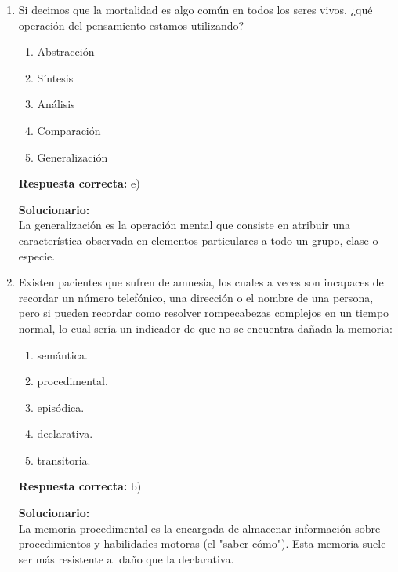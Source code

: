 \begin{enumerate}
	\item Si decimos que la mortalidad es algo común en todos los seres vivos, ¿qué operación del pensamiento estamos utilizando?
	\begin{enumerate}[label=\alph*)]
		\item Abstracción
		\item Síntesis
		\item Análisis
		\item Comparación
		\item Generalización
	\end{enumerate}
	\textbf{Respuesta correcta:} e)
	
	\vspace{2mm}
	\textbf{Solucionario:}\\
	La generalización es la operación mental que consiste en atribuir una característica observada en elementos particulares a todo un grupo, clase o especie.
	
	\vspace{6mm}
	
	\item Existen pacientes que sufren de amnesia, los cuales a veces son incapaces de recordar un número telefónico, una dirección o el nombre de una persona, pero si pueden recordar como resolver rompecabezas complejos en un tiempo normal, lo cual sería un indicador de que no se encuentra dañada la memoria:
	\begin{enumerate}[label=\alph*)]
		\item semántica.
		\item procedimental.
		\item episódica.
		\item declarativa.
		\item transitoria.
	\end{enumerate}
	\textbf{Respuesta correcta:} b)
	
	\vspace{2mm}
	\textbf{Solucionario:}\\
	La memoria procedimental es la encargada de almacenar información sobre procedimientos y habilidades motoras (el "saber cómo"). Esta memoria suele ser más resistente al daño que la declarativa.
	
	\vspace{6mm}
	

\end{enumerate}
